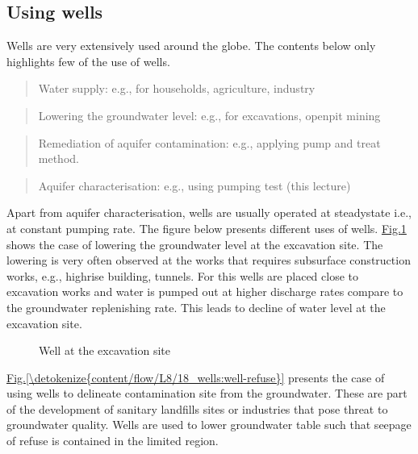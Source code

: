 \documentclass[letterpaper,10pt,english]{jupyterBook}
\begin{document}
\subsection{Using wells}
\label{\detokenize{content/flow/L8/18_wells:using-wells}}
\sphinxAtStartPar
Wells are very extensively used around the globe. The contents below only highlights few of the use of wells.
\begin{quote}

\sphinxAtStartPar
Water supply: e.g., for households, agriculture, industry
\end{quote}
\begin{quote}

\sphinxAtStartPar
Lowering the groundwater level: e.g., for excavations, open\sphinxhyphen{}pit mining
\end{quote}
\begin{quote}

\sphinxAtStartPar
Remediation of aquifer contamination: e.g., applying pump and treat method.
\end{quote}
\begin{quote}

\sphinxAtStartPar
Aquifer characterisation: e.g., using pumping test (this lecture)
\end{quote}

\sphinxAtStartPar
Apart from aquifer characterisation, wells are usually operated at steady\sphinxhyphen{}state i.e., at constant pumping rate. The figure below presents different uses of wells. \hyperref[\detokenize{content/flow/L8/18_wells:well-ex}]{Fig.\@ \ref{\detokenize{content/flow/L8/18_wells:well-ex}}} shows the case of lowering the groundwater level at the excavation site. The lowering is very often observed at the works that requires sub\sphinxhyphen{}surface construction works, e.g., high\sphinxhyphen{}rise building, tunnels. For this wells are placed close to excavation works and water is pumped out at higher discharge rates compare to the groundwater replenishing rate. This leads to decline of water level at the excavation site.

\begin{figure}[htbp]
\centering
\capstart

\noindent{}
\caption{Well at the excavation site}\label{\detokenize{content/flow/L8/18_wells:well-ex}}\end{figure}

\sphinxAtStartPar
\hyperref[\detokenize{content/flow/L8/18_wells:well-refuse}]{Fig.\@ \ref{\detokenize{content/flow/L8/18_wells:well-refuse}}} presents the case of using wells to delineate contamination site from the groundwater. These are part of the development of sanitary landfills sites or industries that pose threat to groundwater quality. Wells are used to lower groundwater table such that seepage of refuse is contained in the limited region.
\end{document}
